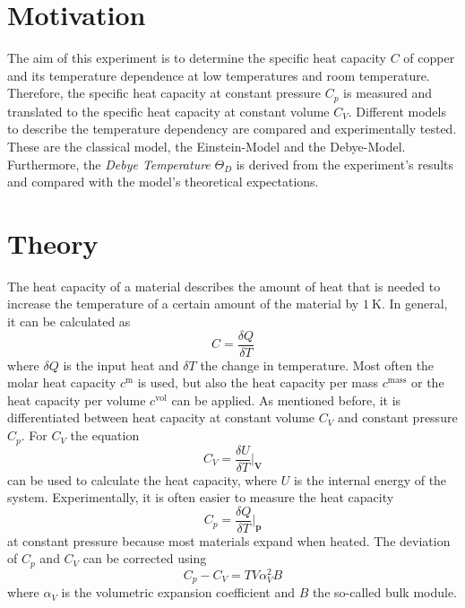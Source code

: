 \section{Motivation}
\label{sec:Motivation}
The aim of this experiment is to determine the specific heat capacity $C$ of copper and its temperature dependence at low temperatures and room temperature.
Therefore, the specific heat capacity at constant pressure $C_p$ is measured and translated to the specific heat capacity at constant volume $C_V$.
Different models to describe the temperature dependency are compared and experimentally tested. These are the classical model, the Einstein-Model and the Debye-Model.
Furthermore, the \textit{Debye Temperature} $\Theta_D$ is
derived from the experiment's results and compared with the model's theoretical expectations.

\section{Theory}
\label{sec:Theory}
The heat capacity of a material describes the amount of heat that is needed to increase the temperature of a certain amount of the material by $\qty{1}{\kelvin}$.
In general, it can be calculated as
\begin{equation*}
    C = \frac{\delta Q}{\delta T}
\end{equation*}
where $\delta Q$ is the input heat and $\delta T$ the change in temperature.
Most often the molar heat capacity $c^\text{m}$ is used, but also the heat capacity per mass $c^\text{mass}$ or the heat capacity per volume $c^\text{vol}$ can be applied.
As mentioned before, it is differentiated between heat capacity at constant volume $C_V$ and constant pressure $C_p$.
For $C_V$ the equation
\begin{equation}
    \label{eqn:CV}
    C_V = \frac{\delta U}{\delta T} \biggr\rvert_{\mathbf{V}}
\end{equation}
can be used to calculate the heat capacity, where $U$ is the internal energy of the system. Experimentally, it is often easier to measure the heat capacity
\begin{equation}
    C_p = \frac{\delta Q}{\delta T} \biggr\rvert_{\mathbf{p}}
    \label{eq:Cp}
\end{equation}
at constant pressure because most materials expand when heated.
The deviation of $C_p$ and $C_V$ can be corrected using
\begin{equation}
    \label{eqn:Cp_CV}
    C_p - C_V = T V \alpha^2_V B
\end{equation}
where $\alpha_V$ is the volumetric expansion coefficient and $B$ the so-called bulk module.

